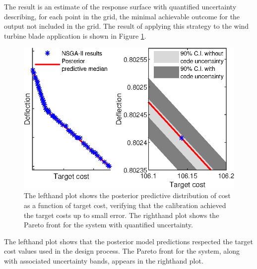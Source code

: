 \documentclass[12pt]{article}
\begin{document}
The result is an estimate of the response surface with quantified uncertainty describing, for each point in the grid, the minimal achievable outcome for the output not included in the grid.
%
%
%
The result of applying this strategy to the wind turbine blade application is shown in Figure \ref{fig:known_cost}. 
%
\begin{figure}[h]
\centering
\includegraphics[scale=.8]{FIG_cost_grid_pareto_bands.eps}
\caption{The lefthand plot shows the posterior predictive distribution of cost as a function of target cost, verifying that the calibration achieved the target costs up to small error. The righthand plot shows the Pareto front for the system with quantified uncertainty.}
\label{fig:known_cost}
\end{figure}
%
The lefthand plot shows that the posterior model predictions respected the target cost values used in the design process.
%
The Pareto front for the system, along with associated uncertainty bands, appears in the righthand plot.
%
%
%
\end{document}
